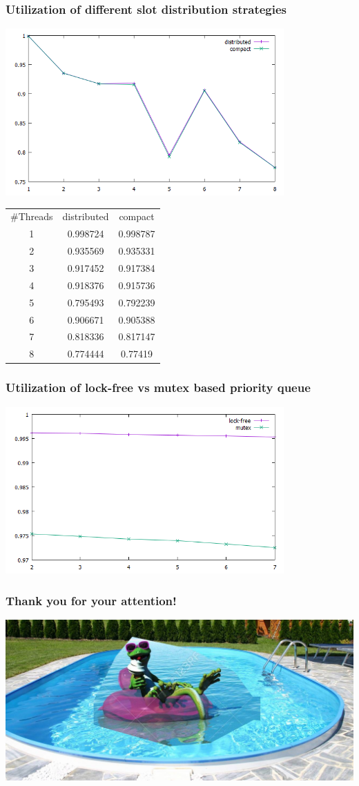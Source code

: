 \documentclass{beamer}
\begin{document}
\begin{frame}
	\frametitle{Utilization of different slot distribution strategies}
	\begin{center}
		\includegraphics[width=0.8\textwidth]{img/slot_distr.png}
	\end{center}
	\begin{tabular}{c|c|c}
		\#Threads & distributed & compact \\
		1 & 0.998724 & 0.998787 \\
		2 & 0.935569 & 0.935331 \\
		3 & 0.917452 & 0.917384 \\
		4 & 0.918376 & 0.915736 \\
		5 & 0.795493 & 0.792239 \\
		6 & 0.906671 & 0.905388 \\
		7 & 0.818336 & 0.817147 \\
		8 & 0.774444 & 0.77419		
	\end{tabular}
\end{frame}

\begin{frame}
	\frametitle{Utilization of lock-free vs mutex based priority queue}
	\begin{center}
		\includegraphics[width=0.8\textwidth]{img/lock_free.png}
	\end{center}
\end{frame}



\begin{frame}
    \frametitle{Thank you for your attention!}
 	\includegraphics[width=\textwidth]{img/important.jpg}
\end{frame}
\end{document}
